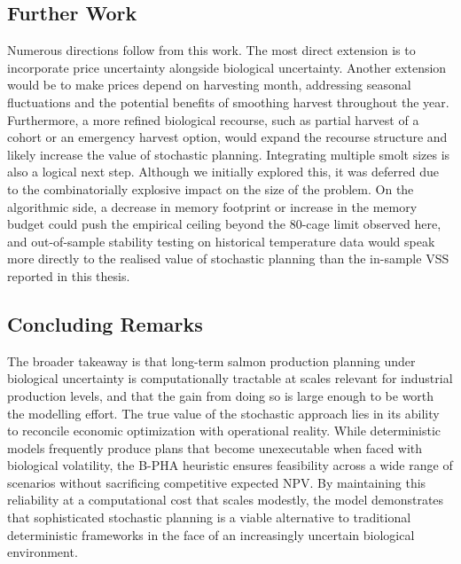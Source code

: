 \documentclass[12pt,a4paper]{article}
\begin{document}
\subsection{Further Work}
Numerous directions follow from this work. The most direct extension is to incorporate price uncertainty alongside biological uncertainty. Another extension would be to make prices depend on harvesting month, addressing seasonal fluctuations and the potential benefits of smoothing harvest throughout the year. Furthermore, a more refined biological recourse, such as partial harvest of a cohort or an emergency harvest option, would expand the recourse structure and likely increase the value of stochastic planning. Integrating multiple smolt sizes is also a logical next step. Although we initially explored this, it was deferred due to the combinatorially explosive impact on the size of the problem. On the algorithmic side, a decrease in memory footprint or increase in the memory budget could push the empirical ceiling beyond the 80-cage limit observed here, and out-of-sample stability testing on historical temperature data would speak more directly to the realised value of stochastic planning than the in-sample VSS reported in this thesis.

\subsection{Concluding Remarks}
The broader takeaway is that long-term salmon production planning under biological uncertainty is computationally tractable at scales relevant for industrial production levels, and that the gain from doing so is large enough to be worth the modelling effort. The true value of the stochastic approach lies in its ability to reconcile economic optimization with operational reality. While deterministic models frequently produce plans that become unexecutable when faced with biological volatility, the B-PHA heuristic ensures feasibility across a wide range of scenarios without sacrificing competitive expected NPV. By maintaining this reliability at a computational cost that scales modestly, the model demonstrates that sophisticated stochastic planning is a viable alternative to traditional deterministic frameworks in the face of an increasingly uncertain biological environment. 
\newpage




\end{document}
